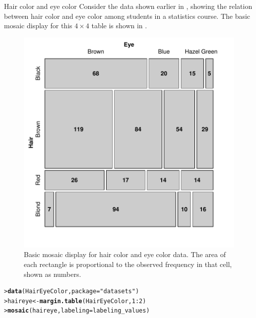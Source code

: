 \documentclass[10pt,krantz2]{krantz}\usepackage[]{graphicx}\usepackage[]{color}
\makeatletter
\newcommand{\hlnum}[1]{\textcolor[rgb]{0.686,0.059,0.569}{#1}}%
\newcommand{\hlstr}[1]{\textcolor[rgb]{0.192,0.494,0.8}{#1}}%
\newcommand{\hlopt}[1]{\textcolor[rgb]{0,0,0}{#1}}%
\newcommand{\hlstd}[1]{\textcolor[rgb]{0.345,0.345,0.345}{#1}}%
\newcommand{\hlkwb}[1]{\textcolor[rgb]{0.69,0.353,0.396}{#1}}%
\newcommand{\hlkwc}[1]{\textcolor[rgb]{0.333,0.667,0.333}{#1}}%
\newcommand{\hlkwd}[1]{\textcolor[rgb]{0.737,0.353,0.396}{\textbf{#1}}}%
\newenvironment{kframe}{%
 \def\at@end@of@kframe{}%
 \ifinner\ifhmode%
  \def\at@end@of@kframe{\end{minipage}}%
  \begin{minipage}{\columnwidth}%
 \fi\fi%
 \def\FrameCommand##1{\hskip\@totalleftmargin \hskip-\fboxsep
 \colorbox{shadecolor}{##1}\hskip-\fboxsep
     \hskip-\linewidth \hskip-\@totalleftmargin \hskip\columnwidth}%
 \MakeFramed {\advance\hsize-\width
   \@totalleftmargin\z@ \linewidth\hsize
   \@setminipage}}%
 {\par\unskip\endMakeFramed%
 \at@end@of@kframe}
\newenvironment{knitrout}{}{} %
\renewenvironment{knitrout}{\small\renewcommand{\baselinestretch}{.85}}{} %
\makeatother
\begin{document}
\begin{Example}[haireye2a]{Hair color and eye color}
Consider the data shown earlier in  ,
showing the relation between hair color and eye color among students
in a statistics course.  The basic mosaic display for this $4 \times 4$
table is shown in .

\begin{knitrout}
\color{fgcolor}\begin{figure}[!htbp]

\centerline{\includegraphics[width=.6\textwidth]{ch05/fig/haireye-mos1-1} }

\caption[Basic mosaic display for hair color and eye color data]{Basic mosaic display for hair color and eye color data.  The area of each rectangle is proportional to the observed frequency in that cell, shown as numbers.\label{fig:haireye-mos1}}
\end{figure}


\end{knitrout}

\begin{knitrout}
\color{fgcolor}\begin{kframe}
\begin{alltt}
\hlstd{> }\hlkwd{data}\hlstd{(HairEyeColor,} \hlkwc{package} \hlstd{=} \hlstr{"datasets"}\hlstd{)}
\hlstd{> }\hlstd{haireye} \hlkwb{<-} \hlkwd{margin.table}\hlstd{(HairEyeColor,} \hlnum{1} \hlopt{:} \hlnum{2}\hlstd{)}
\hlstd{> }\hlkwd{mosaic}\hlstd{(haireye,} \hlkwc{labeling} \hlstd{= labeling_values)}
\end{alltt}
\end{kframe}
\end{knitrout}


\end{Example}
\end{document}
